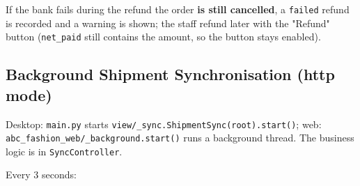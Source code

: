 If the bank fails during the refund the order \textbf{is still
cancelled}, a \texttt{failed} refund is recorded and a warning is shown;
the staff refund later with the "Refund" button (\texttt{net\_\allowbreak{}paid}
still contains the amount, so the button stays enabled).

\hypertarget{flow-sync}{%
\subsection{Background Shipment Synchronisation (http
mode)}\label{flow-sync}}

Desktop: \texttt{main.\allowbreak{}py} starts
\texttt{view/\allowbreak{}\_\allowbreak{}sync.\allowbreak{}ShipmentSync(\allowbreak{}root).\allowbreak{}start(\allowbreak{})}; web:
\texttt{abc\_\allowbreak{}fashion\_\allowbreak{}web/\allowbreak{}\_\allowbreak{}background.\allowbreak{}start(\allowbreak{})} runs a background
thread. The business logic is in \texttt{SyncController}.

Every 3 seconds:

